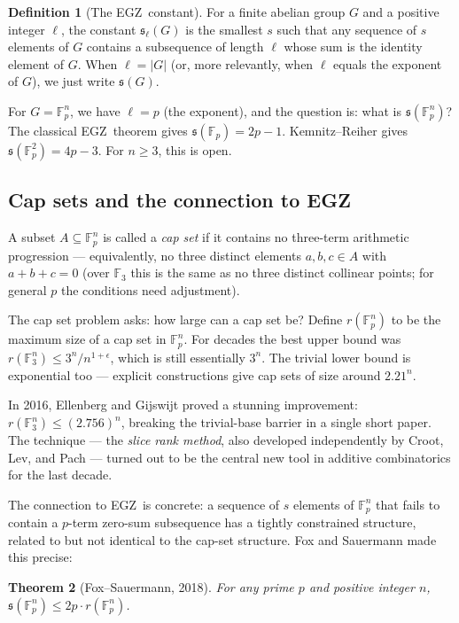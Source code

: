 \documentclass[11pt,a4paper]{article}
\theoremstyle{plain}
\newtheorem{theorem}{Theorem}[section]
\theoremstyle{definition}
\newtheorem{definition}[theorem]{Definition}
\theoremstyle{remark}
\newcommand{\F}{\mathbb{F}}
\newcommand{\sUFp}{\mathfrak{s}}
\newcommand{\EGZ}{\textsf{EGZ}}
\begin{document}
\begin{definition}[The \EGZ\ constant]
For a finite abelian group $G$ and a positive integer $\ell$, the constant $\sUFp_\ell(G)$ is the smallest $s$ such that any sequence of $s$ elements of $G$ contains a subsequence of length $\ell$ whose sum is the identity element of $G$. When $\ell = |G|$ (or, more relevantly, when $\ell$ equals the exponent of $G$), we just write $\sUFp(G)$.
\end{definition}

For $G = \F_p^n$, we have $\ell = p$ (the exponent), and the question is: what is $\sUFp(\F_p^n)$? The classical \EGZ\ theorem gives $\sUFp(\F_p) = 2p - 1$. Kemnitz--Reiher gives $\sUFp(\F_p^2) = 4p - 3$. For $n \geq 3$, this is open.

\subsection{Cap sets and the connection to \EGZ}

A subset $A \subseteq \F_p^n$ is called a \emph{cap set} if it contains no three-term arithmetic progression --- equivalently, no three distinct elements $a, b, c \in A$ with $a + b + c = 0$ (over $\F_3$ this is the same as no three distinct collinear points; for general $p$ the conditions need adjustment).

The cap set problem asks: how large can a cap set be? Define $r(\F_p^n)$ to be the maximum size of a cap set in $\F_p^n$. For decades the best upper bound was $r(\F_3^n) \leq 3^n / n^{1+\epsilon}$, which is still essentially $3^n$. The trivial lower bound is exponential too --- explicit constructions give cap sets of size around $2.21^n$.

In 2016, Ellenberg and Gijswijt proved a stunning improvement: $r(\F_3^n) \leq (2.756)^n$, breaking the trivial-base barrier in a single short paper. The technique --- the \emph{slice rank method}, also developed independently by Croot, Lev, and Pach --- turned out to be the central new tool in additive combinatorics for the last decade.

The connection to \EGZ\ is concrete: a sequence of $s$ elements of $\F_p^n$ that fails to contain a $p$-term zero-sum subsequence has a tightly constrained structure, related to but not identical to the cap-set structure. Fox and Sauermann made this precise:

\begin{theorem}[Fox--Sauermann, 2018]
\label{thm:fox-sauermann}
For any prime $p$ and positive integer $n$, $\sUFp(\F_p^n) \leq 2p \cdot r(\F_p^n)$.
\end{theorem}
\end{document}
